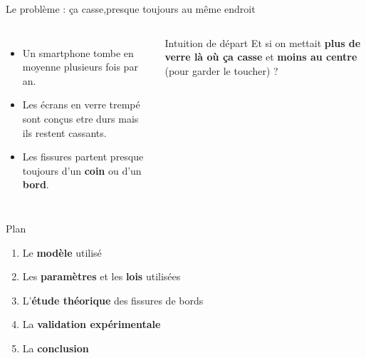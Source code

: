 \documentclass[11pt,aspectratio=169]{beamer}
\begin{document}
\begin{frame}{Le problème : ça casse,presque toujours au même endroit}
  \begin{columns}[T]
    \begin{itemize}
      \item Un smartphone tombe en moyenne plusieurs fois par an.
      \item Les écrans en verre trempé sont conçus etre durs mais ils restent cassants.
      \item Les fissures partent presque toujours d'un \textbf{coin} ou d'un \textbf{bord}.
    \end{itemize}
    \vspace{0.3cm}
    \begin{block}{Intuition de départ}
      Et si on mettait \textbf{plus de verre là où ça casse}
      et \textbf{moins au centre} (pour garder le toucher) ?
    \end{block}
    \centering
  \end{columns}
\end{frame}

\begin{frame}{Plan}
  \vfill
  \Large
  \begin{enumerate}[leftmargin=2.4em,itemsep=12pt,
                    label=\textcolor{verre}{\bfseries\arabic*.}]
    \item Le \textbf{modèle} utilisé
    \item Les \textbf{paramètres} et les \textbf{lois} utilisées
    \item L'\textbf{étude théorique} des fissures de bords
    \item La \textbf{validation expérimentale}
    \item La \textbf{conclusion}
  \end{enumerate}
  \vfill
\end{frame}
\end{document}
